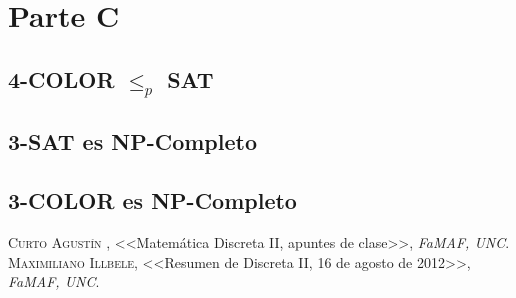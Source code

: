 \documentclass[12pt,a4paper]{report}
\begin{document}
		

\chapter{Parte C}

	\section{4-COLOR $\leq_{\textit{p}}$ SAT}
	
	\section{3-SAT es NP-Completo}
	
	\section{3-COLOR es NP-Completo}
	
	
\begin{thebibliography}{X}
 \textsc{Curto Agustín },
<<Matemática Discreta II, apuntes de clase>>,
\textit{FaMAF, UNC}.
 \textsc{Maximiliano Illbele},
<<Resumen de Discreta II, 16 de agosto de 2012>>,
\textit{FaMAF, UNC}.
\end{thebibliography}
\end{document}
